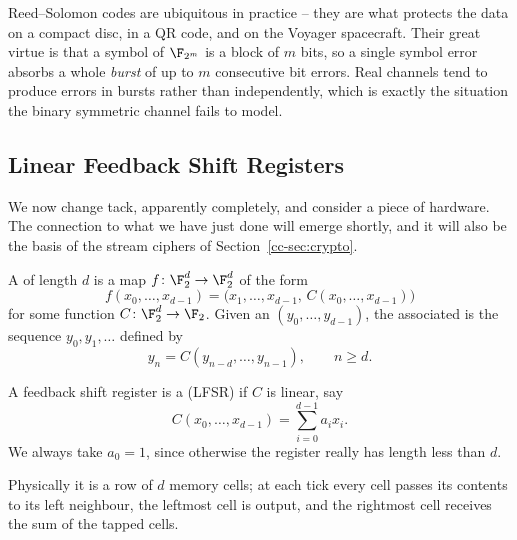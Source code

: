 \begin{remark}
	Reed--Solomon codes are ubiquitous in practice -- they are what protects the data on a compact disc, in a QR code, and on the Voyager spacecraft. Their great virtue is that a symbol of $\F_{2^m}$ is a block of $m$ bits, so a single symbol error absorbs a whole \emph{burst} of up to $m$ consecutive bit errors. Real channels tend to produce errors in bursts rather than independently, which is exactly the situation the binary symmetric channel fails to model.
\end{remark}

\subsection{Linear Feedback Shift Registers}

We now change tack, apparently completely, and consider a piece of hardware. The connection to what we have just done will emerge shortly, and it will also be the basis of the stream ciphers of Section~\ref{cc-sec:crypto}.

\begin{definition}
	A  of length $d$ is a map $f\colon\F_2^d\to\F_2^d$ of the form
	$$f(x_0,\dots,x_{d-1}) = \bigl(x_1,\dots,x_{d-1},\,C(x_0,\dots,x_{d-1})\bigr)$$
	for some function $C\colon\F_2^d\to\F_2$. Given an  $(y_0,\dots,y_{d-1})$, the associated  is the sequence $y_0,y_1,\dots$ defined by
	$$y_n = C(y_{n-d},\dots,y_{n-1}), \qquad n \ge d.$$
\end{definition}

\begin{definition}[LFSR]
	A feedback shift register is a  (LFSR) if $C$ is linear, say
	$$C(x_0,\dots,x_{d-1}) = \sum_{i=0}^{d-1}a_ix_i.$$
	We always take $a_0 = 1$, since otherwise the register really has length less than $d$.
\end{definition}

Physically it is a row of $d$ memory cells; at each tick every cell passes its contents to its left neighbour, the leftmost cell is output, and the rightmost cell receives the sum of the tapped cells.

